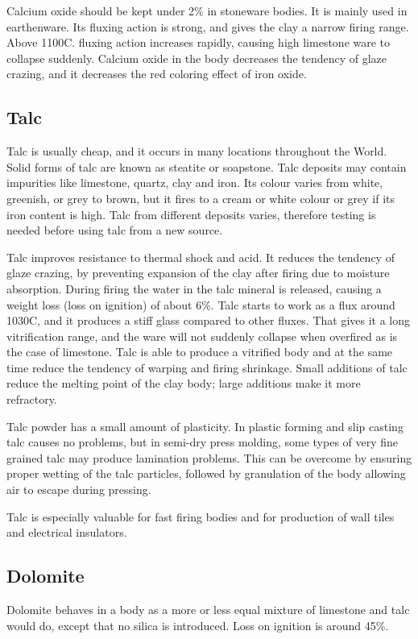 Calcium oxide should be kept under 2\% in stoneware bodies. It is mainly used 
in earthenware. Its fluxing action is strong, and gives the clay a narrow 
firing range. Above 1100\degree C. fluxing action increases rapidly, causing 
high limestone ware to collapse suddenly. Calcium oxide in the body decreases 
the tendency of glaze crazing, and it decreases the red coloring effect of iron 
oxide.
\subsection{Talc}
Talc is usually cheap, and it occurs in many locations throughout the World. 
Solid forms of talc are known as steatite or soapstone. Talc deposits may 
contain impurities like limestone, quartz, clay and iron. Its colour varies 
from white, greenish, or grey to brown, but it fires to a cream or white colour 
or grey if its iron content is high. Talc from different deposits varies, 
therefore testing is needed before using talc from a new source.

Talc improves resistance to thermal shock and acid. It reduces the tendency of 
glaze crazing, by preventing expansion of the clay after firing due to moisture 
absorption. During firing the water in the talc mineral is released, causing a 
weight loss (loss on ignition) of about 6\%. Talc starts to work as a flux 
around 1030\degree C, and it produces a stiff glass compared to other fluxes. 
That gives it a long vitrification range, and the ware will not suddenly 
collapse when overfired as is the case of limestone. Talc is able to produce a 
vitrified body and at the same time reduce the tendency of warping and firing 
shrinkage. Small additions of talc reduce the melting point of the clay body; 
large additions make it more refractory.

Talc powder has a small amount of plasticity. In plastic forming and slip 
casting talc causes no problems, but in semi-dry press molding, some types of 
very fine grained talc may produce lamination problems. This can be overcome by 
ensuring proper wetting of the talc particles, followed by granulation of the 
body allowing air to escape during pressing.

Talc is especially valuable for fast firing bodies and for production of wall 
tiles and electrical insulators.
\subsection{Dolomite}
Dolomite behaves in a body as a more or less equal mixture of limestone and 
talc would do, except that no silica is introduced. Loss on ignition is around 
45\%.
